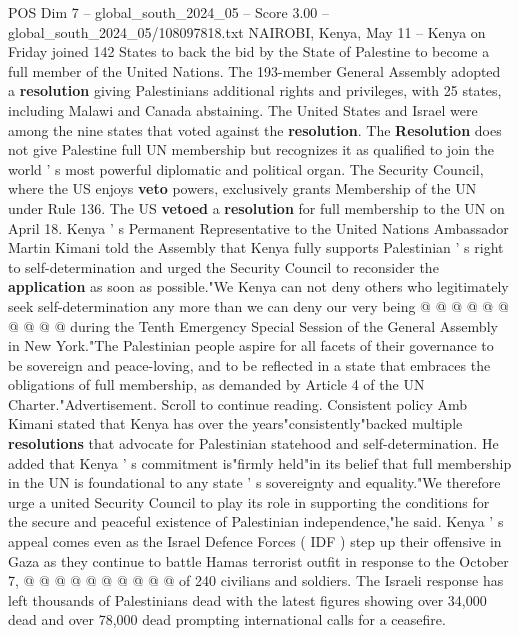 \begin{textsample}{POS Dim 7 – global\_south\_2024\_05 – Score 3.00 – global\_south\_2024\_05/108097818.txt}  \label{ex:f7_pos_068}
NAIROBI, Kenya, May 11 -- Kenya on Friday joined 142 States to back the bid by the State of Palestine to become a full member of the United Nations.
The 193-member General Assembly adopted a \textbf{resolution} giving Palestinians additional rights and privileges, with 25 states, including Malawi and Canada abstaining.
The United States and Israel were among the nine states that voted against the \textbf{resolution}.
The \textbf{Resolution} does not give Palestine full UN membership but recognizes it as qualified to join the world ' s most powerful diplomatic and political organ.
The Security Council, where the US enjoys \textbf{veto} powers, exclusively grants Membership of the UN under Rule 136.
The US \textbf{vetoed} a \textbf{resolution} for full membership to the UN on April 18.
Kenya ' s Permanent Representative to the United Nations Ambassador Martin Kimani told the Assembly that Kenya fully supports Palestinian ' s right to self-determination and urged the Security Council to reconsider the \textbf{application} as soon as possible."We Kenya can not deny others who legitimately seek self-determination any more than we can deny our very being @ @ @ @ @ @ @ @ @ @ during the Tenth Emergency Special Session of the General Assembly in New York."The Palestinian people aspire for all facets of their governance to be sovereign and peace-loving, and to be reflected in a state that embraces the obligations of full membership, as demanded by Article 4 of the UN Charter."Advertisement.
Scroll to continue reading.
Consistent policy Amb Kimani stated that Kenya has over the years"consistently"backed multiple \textbf{resolutions} that advocate for Palestinian statehood and self-determination.
He added that Kenya ' s commitment is"firmly held"in its belief that full membership in the UN is foundational to any state ' s sovereignty and equality."We therefore urge a united Security Council to play its role in supporting the conditions for the secure and peaceful existence of Palestinian independence,"he said.
Kenya ' s appeal comes even as the Israel Defence Forces ( IDF ) step up their offensive in Gaza as they continue to battle Hamas terrorist outfit in response to the October 7, @ @ @ @ @ @ @ @ @ @ of 240 civilians and soldiers.
The Israeli response has left thousands of Palestinians dead with the latest figures showing over 34,000 dead and over 78,000 dead prompting international calls for a ceasefire.

\end{textsample}
